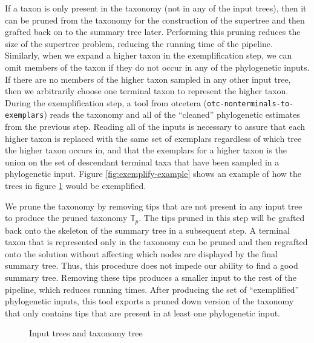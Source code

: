 \documentclass[fleqn,12pt,lineno,english]{wlpeerj}
\newcommand{\lyxdot}{.}
\begin{document}
If a taxon is only present in the taxonomy (not in any of the input
trees), then it can be pruned from the taxonomy for the construction
of the supertree and then grafted back on to the summary tree later.
Performing this pruning reduces the size of the supertree problem,
reducing the running time of the pipeline. Similarly, when we expand
a higher taxon in the exemplification step, we can omit members of
the taxon if they do not occur in any of the phylogenetic inputs.
If there are no members of the higher taxon sampled in any other input
tree, then we arbitrarily choose one terminal taxon to represent the
higher taxon. During the exemplification step, a tool from otcetera
(\texttt{otc-nonterminals-to-exemplars}) reads the taxonomy and all
of the ``cleaned'' phylogenetic estimates from the previous step.
Reading all of the inputs is necessary to assure that each higher
taxon is replaced with the same set of exemplars regardless of which
tree the higher taxon occurs in, and that the exemplars for a higher
taxon is the union on the set of descendant terminal taxa that have
been sampled in a phylogenetic input. Figure \ref{fig:exemplify-example}
shows an example of how the trees in figure \ref{fig:cleaned-phylo-example}
would be exemplified.

We prune the taxonomy by removing tips that are not present in any
input tree to produce the pruned taxonomy $\mathbb{T}_{p}$. The tips
pruned in this step will be grafted back onto the skeleton of the
summary tree in a subsequent step. A terminal taxon that is represented
only in the taxonomy can be pruned and then regrafted onto the solution
without affecting which nodes are displayed by the final summary tree.
Thus, this procedure does not impede our ability to find a good summary
tree. Removing these tips produces a smaller input to the rest of
the pipeline, which reduces running times. After producing the set
of ``exemplified'' phylogenetic inputs, this tool exports a pruned
down version of the taxonomy that only contains tips that are present
in at least one phylogenetic input.

\begin{figure}
\hfill{}\hfill{}

\caption{Input trees and taxonomy tree}
\label{fig:cleaned-phylo-example}
\end{figure}
 
\end{document}
